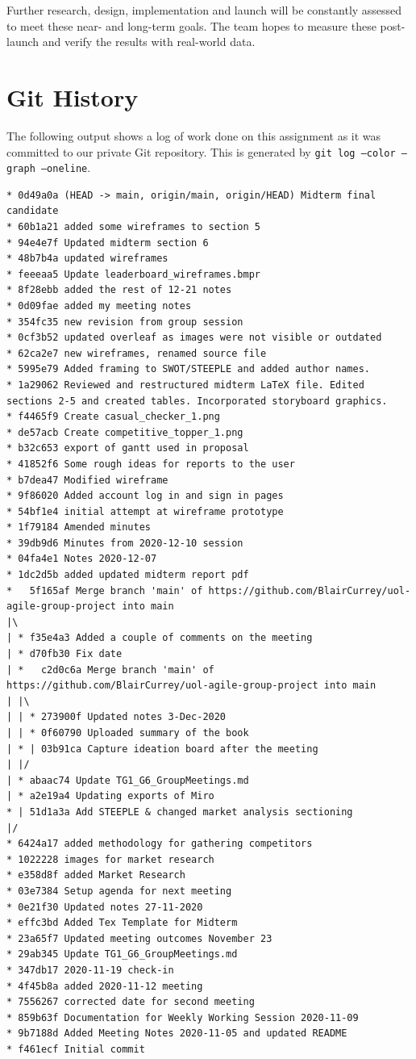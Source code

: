 Further research, design, implementation and launch will be constantly assessed to meet these near- and long-term goals. The team hopes to measure these post-launch and verify the results with real-world data.

\newpage

 


\appendix
\appendixpage
\addappheadtotoc
\section{Git History}
The following output shows a log of work done on this assignment as it was committed to our private Git repository. This is generated by \texttt{git log --color --graph --oneline}.

\begin{verbatim}
* 0d49a0a (HEAD -> main, origin/main, origin/HEAD) Midterm final candidate
* 60b1a21 added some wireframes to section 5
* 94e4e7f Updated midterm section 6
* 48b7b4a updated wireframes
* feeeaa5 Update leaderboard_wireframes.bmpr
* 8f28ebb added the rest of 12-21 notes
* 0d09fae added my meeting notes
* 354fc35 new revision from group session
* 0cf3b52 updated overleaf as images were not visible or outdated
* 62ca2e7 new wireframes, renamed source file
* 5995e79 Added framing to SWOT/STEEPLE and added author names.
* 1a29062 Reviewed and restructured midterm LaTeX file. Edited sections 2-5 and created tables. Incorporated storyboard graphics.
* f4465f9 Create casual_checker_1.png
* de57acb Create competitive_topper_1.png
* b32c653 export of gantt used in proposal
* 41852f6 Some rough ideas for reports to the user
* b7dea47 Modified wireframe
* 9f86020 Added account log in and sign in pages
* 54bf1e4 initial attempt at wireframe prototype
* 1f79184 Amended minutes
* 39db9d6 Minutes from 2020-12-10 session
* 04fa4e1 Notes 2020-12-07
* 1dc2d5b added updated midterm report pdf
*   5f165af Merge branch 'main' of https://github.com/BlairCurrey/uol-agile-group-project into main
|\
| * f35e4a3 Added a couple of comments on the meeting
| * d70fb30 Fix date
| *   c2d0c6a Merge branch 'main' of https://github.com/BlairCurrey/uol-agile-group-project into main
| |\
| | * 273900f Updated notes 3-Dec-2020
| | * 0f60790 Uploaded summary of the book
| * | 03b91ca Capture ideation board after the meeting
| |/
| * abaac74 Update TG1_G6_GroupMeetings.md
| * a2e19a4 Updating exports of Miro
* | 51d1a3a Add STEEPLE & changed market analysis sectioning
|/
* 6424a17 added methodology for gathering competitors
* 1022228 images for market research
* e358d8f added Market Research
* 03e7384 Setup agenda for next meeting
* 0e21f30 Updated notes 27-11-2020
* effc3bd Added Tex Template for Midterm
* 23a65f7 Updated meeting outcomes November 23
* 29ab345 Update TG1_G6_GroupMeetings.md
* 347db17 2020-11-19 check-in
* 4f45b8a added 2020-11-12 meeting
* 7556267 corrected date for second meeting
* 859b63f Documentation for Weekly Working Session 2020-11-09
* 9b7188d Added Meeting Notes 2020-11-05 and updated README
* f461ecf Initial commit
\end{verbatim}


